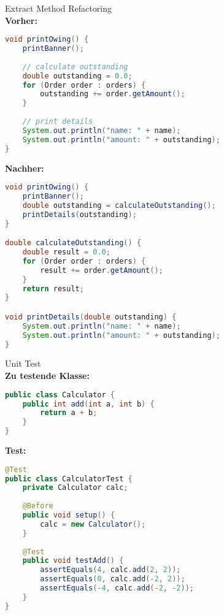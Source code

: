 \begin{example}{Extract Method Refactoring}\\
\textbf{Vorher:}
\begin{lstlisting}[language=Java, style=base]
void printOwing() {
    printBanner();
    
    // calculate outstanding
    double outstanding = 0.0;
    for (Order order : orders) {
        outstanding += order.getAmount();
    }
    
    // print details
    System.out.println("name: " + name);
    System.out.println("amount: " + outstanding);
}
\end{lstlisting}

\textbf{Nachher:}
\begin{lstlisting}[language=Java, style=base]
void printOwing() {
    printBanner();
    double outstanding = calculateOutstanding();
    printDetails(outstanding);
}

double calculateOutstanding() {
    double result = 0.0;
    for (Order order : orders) {
        result += order.getAmount();
    }
    return result;
}

void printDetails(double outstanding) {
    System.out.println("name: " + name);
    System.out.println("amount: " + outstanding);
}
\end{lstlisting}
\end{example}

\begin{example}{Unit Test}\\
\textbf{Zu testende Klasse:}
\begin{lstlisting}[language=Java, style=base]
public class Calculator {
    public int add(int a, int b) {
        return a + b;
    }
}
\end{lstlisting}

\textbf{Test:}
\begin{lstlisting}[language=Java, style=base]
@Test
public class CalculatorTest {
    private Calculator calc;
    
    @Before
    public void setup() {
        calc = new Calculator();
    }
    
    @Test
    public void testAdd() {
        assertEquals(4, calc.add(2, 2));
        assertEquals(0, calc.add(-2, 2));
        assertEquals(-4, calc.add(-2, -2));
    }
}
\end{lstlisting}
\end{example}

